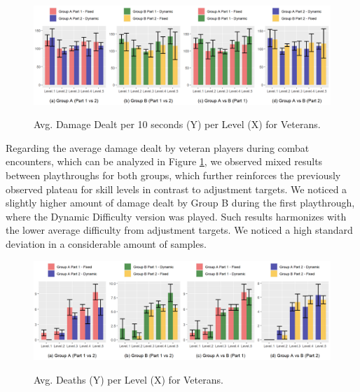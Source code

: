 \begin{figure}[!ht]
    \begin{center}
    \caption{Avg. Damage Dealt per 10 seconds (Y) per Level (X) for Veterans.}
        \includegraphics[width=\textwidth]{figures/damage_dealt_per_10s-veteran_players.png}
        \label{fig:result-metric-veterans-damage-dealt-per-10s}
    \end{center}
\end{figure}

Regarding the average damage dealt by veteran players during combat encounters, which can be analyzed in Figure \ref{fig:result-metric-veterans-damage-dealt-per-10s}, we observed mixed results between playthroughs for both groups, which further reinforces the previously observed plateau for skill levels in contrast to adjustment targets. We noticed a slightly higher amount of damage dealt by Group B during the first playthrough, where the Dynamic Difficulty version was played. Such results harmonizes with the lower average difficulty from adjustment targets. We noticed a high standard deviation in a considerable amount of samples.

\begin{figure}[!ht]
    \begin{center}
    \caption{Avg. Deaths (Y) per Level (X) for Veterans.}
        \includegraphics[width=\textwidth]{figures/deaths_per_level-veteran_players.png}
        \label{fig:result-metric-veterans-deaths-per-level}
    \end{center}
\end{figure}

